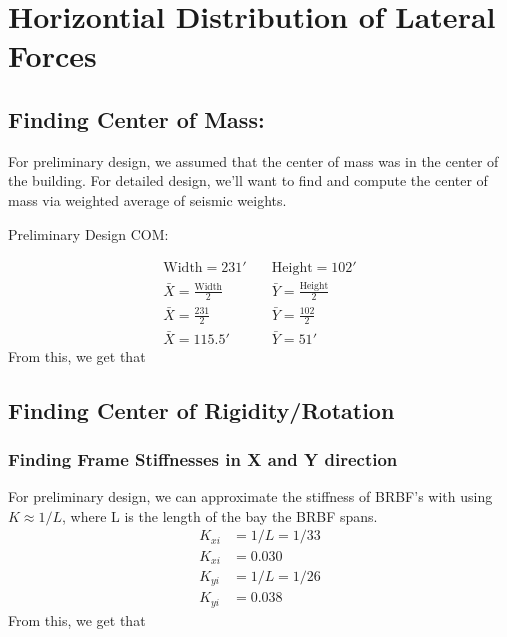 \documentclass{report} %
\begin{document}
\newpage
\section*{Horizontial Distribution of Lateral Forces}
\subsection*{Finding Center of Mass:}
For preliminary design, we assumed that the center of mass was in the center of the building. For detailed design, we'll want to find and compute the center of mass via weighted average of seismic weights.

\begin{center}
    Preliminary Design COM:    
\end{center}
\begin{equation*}
    \begin{aligned}
        \text{Width} = 231' &\quad \text{Height} = 102' \\
        \bar{X} = \frac{\text{Width}}{2} &\quad \bar{Y} = \frac{\text{Height}}{2} \\
        \bar{X} = \frac{231}{2} &\quad \bar{Y} = \frac{102}{2} \\
        \bar{X} = 115.5' &\quad \bar{Y} = 51'
    \end{aligned}
\end{equation*}
From this, we get that 

\subsection*{Finding Center of Rigidity/Rotation}
\subsubsection*{Finding Frame Stiffnesses in X and Y direction}
For preliminary design, we can approximate the stiffness of BRBF's with using $K \approx  1/L$, where L is the length of the bay the BRBF spans.
\begin{equation*}
    \begin{aligned}
        K_{xi} &= 1/L = 1/33 \\
        K_{xi} &= 0.030 \\
        K_{yi} &= 1/L = 1/26 \\ 
        K_{yi} &= 0.038 
    \end{aligned}
\end{equation*}
From this, we get that  \\
\end{document}
